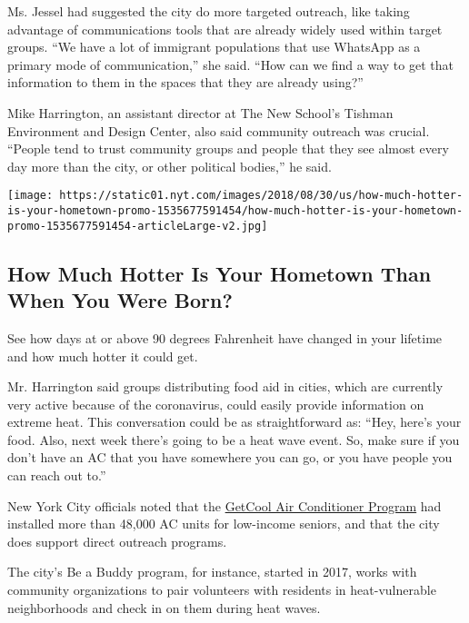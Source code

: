 Ms. Jessel had suggested the city do more targeted outreach, like taking
advantage of communications tools that are already widely used within
target groups. ``We have a lot of immigrant populations that use
WhatsApp as a primary mode of communication,'' she said. ``How can we
find a way to get that information to them in the spaces that they are
already using?''

Mike Harrington, an assistant director at The New School's Tishman
Environment and Design Center, also said community outreach was crucial.
``People tend to trust community groups and people that they see almost
every day more than the city, or other political bodies,'' he said.

\href{https://www.nytimes.com/interactive/2018/08/30/climate/how-much-hotter-is-your-hometown.html}{}

\texttt{[image: https://static01.nyt.com/images/2018/08/30/us/how-much-hotter-is-your-hometown-promo-1535677591454/how-much-hotter-is-your-hometown-promo-1535677591454-articleLarge-v2.jpg]}

\hypertarget{how-much-hotter-is-your-hometown-than-when-you-were-born}{%
\subsection{How Much Hotter Is Your Hometown Than When You Were
Born?}\label{how-much-hotter-is-your-hometown-than-when-you-were-born}}

See how days at or above 90 degrees Fahrenheit have changed in your
lifetime and how much hotter it could get.

Mr. Harrington said groups distributing food aid in cities, which are
currently very active because of the coronavirus, could easily provide
information on extreme heat. This conversation could be as
straightforward as: ``Hey, here's your food. Also, next week there's
going to be a heat wave event. So, make sure if you don't have an AC
that you have somewhere you can go, or you have people you can reach out
to.''

New York City officials noted that the
\href{https://portal.311.nyc.gov/article/?kanumber=KA-03305}{GetCool Air
Conditioner Program} had installed more than 48,000 AC units for
low-income seniors, and that the city does support direct outreach
programs.

The city's Be a Buddy program, for instance, started in 2017, works with
community organizations to pair volunteers with residents in
heat-vulnerable neighborhoods and check in on them during heat waves.

